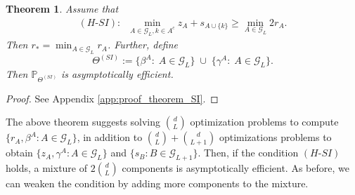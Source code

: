 \documentclass[aap,preprint]{imsart}
\newcommand{\Pro}{{\mathbb{P}}}
\theoremstyle{plain}
\newtheorem{theorem}{Theorem}[section]
\theoremstyle{definition}
\begin{document}
\begin{theorem}\label{thm:sum_intersection_rule}
Assume that 
\begin{align*}
(H\text{-}SI):\;\;
 \min_{A \in \mathcal{G}_L, k \in A^c}   z_A + s_{A \cup \{k\}} \geq \min_{A \in \mathcal{G}_L} 2 r_A.
\end{align*}
Then $r_* = \min_{A \in \mathcal{G}_L} r_A$. Further, define 
$$
\Theta^{(SI)}  :=   \{\beta^{A}:\; A \in \mathcal{G}_L\} \; \cup \; \{\gamma^{A}: \; A \in \mathcal{G}_L\}.
$$
Then $\Pro_{\Theta^{(SI)}}$ is asymptotically efficient. 
\end{theorem}

\begin{proof}
See Appendix \ref{app:proof_theorem_SI}.
\end{proof}

The above theorem suggests solving $\binom{d}{L}$ optimization problems to compute $\{r_A, \beta^{A}: A \in \mathcal{G}_L\}$, in addition to $\binom{d}{L} + \binom{d}{L+1}$ optimizations problems to obtain 
$\{z_A,  {\gamma}^{A}:  A \in \mathcal{G}_L\}$ and
$\{s_B:  B \in \mathcal{G}_{L+1}\}$. Then, if the condition $(H\text{-}SI)$ holds, a mixture of $2 \binom{d}{L}$ components is asymptotically efficient. As before, we can weaken the condition by adding more components to the mixture.
\end{document}
